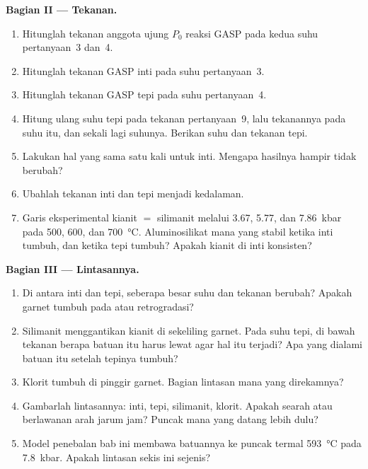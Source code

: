\begin{problem}
\noindent\textbf{Bagian II --- Tekanan.}
\begin{enumerate}[resume]
\item Hitunglah tekanan anggota ujung $P_0$ reaksi GASP pada kedua suhu
pertanyaan~3 dan~4.
\item Hitunglah tekanan GASP inti pada suhu pertanyaan~3.
\item Hitunglah tekanan GASP tepi pada suhu pertanyaan~4.
\item Hitung ulang suhu tepi pada tekanan pertanyaan~9, lalu tekanannya
pada suhu itu, dan sekali lagi suhunya. Berikan suhu dan tekanan
tepi.
\item Lakukan hal yang sama satu kali untuk inti. Mengapa hasilnya hampir tidak berubah?
\item Ubahlah tekanan inti dan tepi menjadi kedalaman.
\item Garis eksperimental kianit $=$ silimanit melalui 3.67, 5.77, dan
\qty{7.86}{kbar} pada 500, 600, dan \qty{700}{\celsius}. Aluminosilikat mana yang stabil
ketika inti tumbuh, dan ketika tepi tumbuh? Apakah kianit di inti konsisten?
\end{enumerate}

\noindent\textbf{Bagian III --- Lintasannya.}
\begin{enumerate}[resume]
\item Di antara inti dan tepi, seberapa besar suhu dan tekanan berubah?
Apakah garnet tumbuh pada  atau retrogradasi?
\item Silimanit menggantikan kianit di sekeliling garnet. Pada suhu tepi,
di bawah tekanan berapa batuan itu harus lewat agar hal itu terjadi? Apa yang dialami batuan itu
setelah tepinya tumbuh?
\item Klorit tumbuh di pinggir garnet. Bagian lintasan mana yang direkamnya?
\item Gambarlah lintasannya: inti, tepi, silimanit, klorit. Apakah searah atau berlawanan arah jarum jam?
Puncak mana yang datang lebih dulu?
\item Model penebalan bab ini membawa batuannya ke puncak termal
\qty{593}{\celsius} pada \qty{7.8}{kbar}. Apakah lintasan sekis ini sejenis?
\end{enumerate}


\end{problem}
